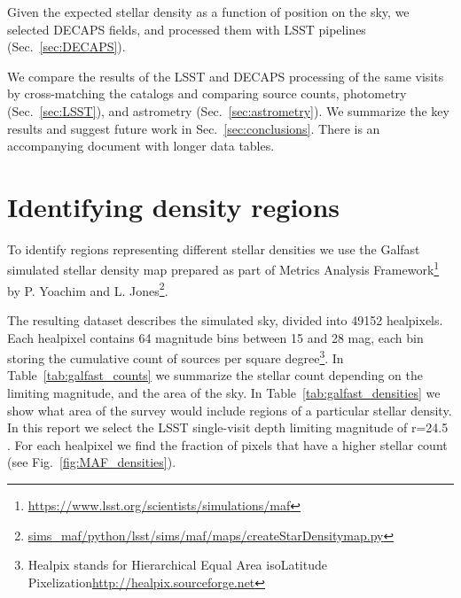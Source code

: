 \documentclass[DM,lsstdraft,toc,usenatbib]{lsstdoc}
\begin{document}
Given the expected stellar density as a function of position on the sky, we selected DECAPS fields, and processed them with LSST pipelines (Sec.~\ref{sec:DECAPS}). 

We compare the results of the LSST and DECAPS processing of the same visits by cross-matching the catalogs and comparing source counts, photometry (Sec.~\ref{sec:LSST}), and astrometry (Sec.~\ref{sec:astrometry}). We summarize the key results and suggest future work in Sec.~\ref{sec:conclusions}. There is an accompanying document with longer data tables. 




\section{Identifying density regions}
\label{sec:MAF}
To identify regions representing different stellar densities we use the Galfast simulated stellar density map  
prepared as part of Metrics Analysis Framework\footnote{\url{https://www.lsst.org/scientists/simulations/maf}} by P. Yoachim and L. Jones\footnote{\url{sims_maf/python/lsst/sims/maf/maps/createStarDensitymap.py}}.

The  resulting dataset describes the simulated sky, divided into 49152 healpixels. Each healpixel contains 64 magnitude bins between 15 and 28 mag, each bin storing the cumulative count of sources per square degree\footnote{Healpix stands for Hierarchical Equal Area isoLatitude Pixelization\url{http://healpix.sourceforge.net}\citep{gorski2005}}.  In Table~\ref{tab:galfast_counts} we summarize the stellar count depending on the limiting magnitude, and the area of the sky. In Table~\ref{tab:galfast_densities} we show what area of the survey would include regions of a particular stellar density. In this report  we select the  LSST single-visit depth limiting magnitude of r=24.5 . For each healpixel we find the fraction of pixels that have a higher stellar count (see Fig.~\ref{fig:MAF_densities}). 
\end{document}
